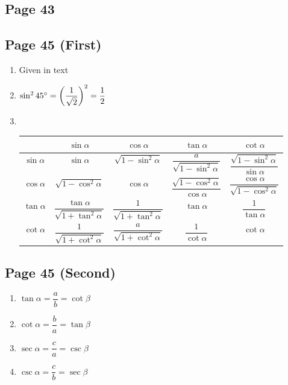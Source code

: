 \documentclass{article}
\newenvironment{solutions}[1]
{\subsection*{#1}
 \begin{enumerate}[leftmargin=1.5em]}
{\end{enumerate}}
\newcommand{\solution}{\item}
\begin{document}
\begin{solutions}{Page 43}
\end{solutions}

\begin{solutions}{Page 45 (First)}
\solution %
Given in text

\solution %
$\sin^{2}{45\degree} = \left(\dfrac{1}{\sqrt{2}}\right)^2 = \dfrac{1}{2}$

\solution ~ %
\begin{center}
\bgroup
\def\arraystretch{2.1}
\setlength\tabcolsep{15pt}
\begin{tabular}{ |c|c|c|c|c| }
\hline
~              & $\sin{\alpha}$                                      & $\cos{\alpha}$                           & $\tan{\alpha}$                                      & $\cot{\alpha}$ \\
\hline
$\sin{\alpha}$ & $\sin{\alpha}$                                      & $\sqrt{1 - \sin^{2}{\alpha}}$            & $\dfrac{a}{\sqrt{1 - \sin^{2}{\alpha}}}$            & $\dfrac{\sqrt{1 - \sin^{2}{\alpha}}}{\sin{\alpha}}$ \\
\hline
$\cos{\alpha}$ & $\sqrt{1 - \cos^{2}{\alpha}}$                       & $\cos{\alpha}$                           & $\dfrac{\sqrt{1 - \cos^{2}{\alpha}}}{\cos{\alpha}}$ & $\dfrac{\cos{\alpha}}{\sqrt{1 - \cos^{2}{\alpha}}}$ \\
\hline
$\tan{\alpha}$ & $\dfrac{\tan{\alpha}}{\sqrt{1 + \tan^{2}{\alpha}}}$ & $\dfrac{1}{\sqrt{1 + \tan^{2}{\alpha}}}$ & $\tan{\alpha}$                                      & $\dfrac{1}{\tan{\alpha}}$ \\
\hline
$\cot{\alpha}$ & $\dfrac{1}{\sqrt{1 + \cot^{2}{\alpha}}}$            & $\dfrac{a}{\sqrt{1 + \cot^{2}{\alpha}}}$ & $\dfrac{1}{\cot{\alpha}}$                           & $\cot{\alpha}$ \\
\hline
\end{tabular}
\egroup
\end{center}
\end{solutions}


\begin{solutions}{Page 45 (Second)}
\solution $\tan{\alpha} = \dfrac{a}{b} = \cot{\beta}$
\solution $\cot{\alpha} = \dfrac{b}{a} = \tan{\beta}$
\solution $\sec{\alpha} = \dfrac{c}{a} = \csc{\beta}$
\solution $\csc{\alpha} = \dfrac{c}{b} = \sec{\beta}$
\end{solutions}
\end{document}
